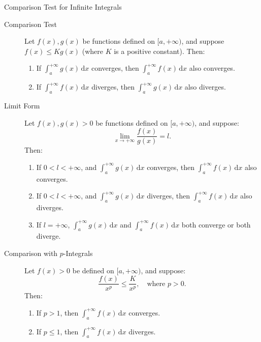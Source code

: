 \documentclass[11pt]{../../TexTemplate/elegantbook}
\begin{document}
\begin{theorem}{Comparison Test for Infinite Integrals}
\begin{description}
    \item[Comparison Test] Let \( f(x), g(x) \) be functions defined on \( [a, +\infty) \), 
        and suppose \( f(x) \leq K g(x) \) (where \( K \) is a positive constant). Then:
    \begin{enumerate}[label=\roman*)]
        \item If \( \int_{a}^{+\infty} g(x) \, \mathrm{d}x \) converges, 
            then \( \int_{a}^{+\infty} f(x) \, \mathrm{d}x \) also converges.
        \item If \( \int_{a}^{+\infty} f(x) \, \mathrm{d}x \) diverges, 
            then \( \int_{a}^{+\infty} g(x) \, \mathrm{d}x \) also diverges.
    \end{enumerate}

    \item[Limit Form] Let \( f(x), g(x) > 0 \) be functions defined on \( [a, +\infty) \), and suppose:
    \[
    \lim_{x \to +\infty} \frac{f(x)}{g(x)} = l.
    \]
    Then:
    \begin{enumerate}[label=\roman*)]
        \item If \( 0 < l < +\infty \), and \( \int_{a}^{+\infty} g(x) \, \mathrm{d}x \) converges, 
            then \( \int_{a}^{+\infty} f(x) \, \mathrm{d}x \) also converges.
        \item If \( 0 < l < +\infty \), and \( \int_{a}^{+\infty} g(x) \, \mathrm{d}x \) diverges, 
            then \( \int_{a}^{+\infty} f(x) \, \mathrm{d}x \) also diverges.
        \item If \( l = +\infty \), \( \int_{a}^{+\infty} g(x) \, \mathrm{d}x \) 
            and \( \int_{a}^{+\infty} f(x) \, \mathrm{d}x \) both converge or both diverge.
    \end{enumerate}

    \item[Comparison with \( p \)-Integrals] Let \( f(x) > 0 \) be defined on \( [a, +\infty) \), and suppose:
    \[
    \frac{f(x)}{x^p} \leq \frac{K}{x^p}, \quad \text{where } p > 0.
    \]
    Then:
    \begin{enumerate}[label=\roman*)]
        \item If \( p > 1 \), then \( \int_{a}^{+\infty} f(x) \, \mathrm{d}x \) converges.
        \item If \( p \leq 1 \), then \( \int_{a}^{+\infty} f(x) \, \mathrm{d}x \) diverges.
    \end{enumerate}


\end{description}
\end{theorem}
\end{document}
